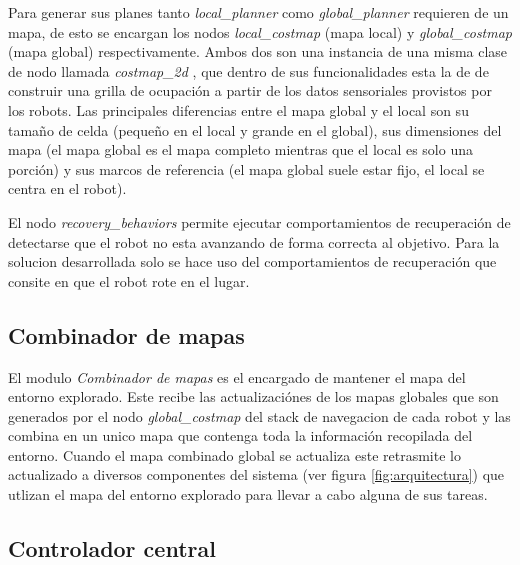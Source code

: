 Para generar sus planes tanto \emph{local\_planner} como \emph{global\_planner}
requieren de un mapa, de esto se encargan los nodos \emph{local\_costmap} (mapa
local) y \emph{global\_costmap} (mapa global) respectivamente. Ambos dos son
una instancia de una misma clase de nodo llamada \emph{costmap\_2d}
\cite{ROS-costmap_2d}, que dentro de sus funcionalidades esta la de de
construir una grilla de ocupación a partir de los datos sensoriales provistos
por los robots. Las principales diferencias entre el mapa global y el local son su
tamaño de celda (pequeño en el local y grande en el global), sus dimensiones
del mapa (el mapa global es el mapa completo mientras que el local es solo una
porción) y sus marcos de referencia (el mapa global suele estar fijo, el local se
centra en el robot).

El nodo \emph{recovery\_behaviors} permite ejecutar comportamientos de
recuperación de detectarse que el robot no esta avanzando de forma correcta al
objetivo. Para la solucion desarrollada solo se hace uso del comportamientos de
recuperación que consite en que el robot rote en el lugar.







\subsection{Combinador de mapas}
El modulo \emph{Combinador de mapas} es el encargado de mantener el mapa del entorno
explorado. Este recibe las actualizaciónes de los mapas globales que son
generados por el nodo \emph{global\_costmap} del stack de navegacion de cada
robot y las combina en un unico mapa que contenga toda la información
recopilada del entorno. Cuando el mapa combinado global se actualiza este
retrasmite lo actualizado a diversos componentes del sistema (ver figura
\ref{fig:arquitectura}) que utlizan el mapa del entorno explorado para llevar a
cabo alguna de sus tareas. 

\subsection{Controlador central}

